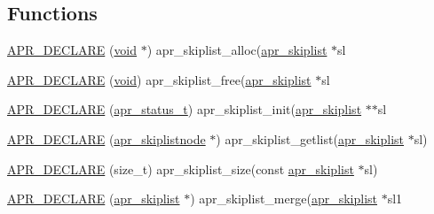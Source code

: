 \subsection*{Functions}
\begin{DoxyCompactItemize}
\item 
\hyperlink{group__apr__skiplist_ga2da4fac756c6e1437849a78294df5b98}{A\+P\+R\+\_\+\+D\+E\+C\+L\+A\+RE} (\hyperlink{group__MOD__ISAPI_gacd6cdbf73df3d9eed42fa493d9b621a6}{void} $\ast$) apr\+\_\+skiplist\+\_\+alloc(\hyperlink{structapr__skiplist}{apr\+\_\+skiplist} $\ast$sl
\item 
\hyperlink{group__apr__skiplist_ga7a6d3458041de4bfdfd313f802a45258}{A\+P\+R\+\_\+\+D\+E\+C\+L\+A\+RE} (\hyperlink{group__MOD__ISAPI_gacd6cdbf73df3d9eed42fa493d9b621a6}{void}) apr\+\_\+skiplist\+\_\+free(\hyperlink{structapr__skiplist}{apr\+\_\+skiplist} $\ast$sl
\item 
\hyperlink{group__apr__skiplist_gae4aea467ebc8b4d193e73dc778f3a73e}{A\+P\+R\+\_\+\+D\+E\+C\+L\+A\+RE} (\hyperlink{group__apr__errno_gaa5105fa83cc322f09382292db8b47593}{apr\+\_\+status\+\_\+t}) apr\+\_\+skiplist\+\_\+init(\hyperlink{structapr__skiplist}{apr\+\_\+skiplist} $\ast$$\ast$sl
\item 
\hyperlink{group__apr__skiplist_gaa4c873c94347b47de84402648338d0b5}{A\+P\+R\+\_\+\+D\+E\+C\+L\+A\+RE} (\hyperlink{structapr__skiplistnode}{apr\+\_\+skiplistnode} $\ast$) apr\+\_\+skiplist\+\_\+getlist(\hyperlink{structapr__skiplist}{apr\+\_\+skiplist} $\ast$sl)
\item 
\hyperlink{group__apr__skiplist_ga8169b97f9872e2cbde4fe1d5bacaaf32}{A\+P\+R\+\_\+\+D\+E\+C\+L\+A\+RE} (size\+\_\+t) apr\+\_\+skiplist\+\_\+size(const \hyperlink{structapr__skiplist}{apr\+\_\+skiplist} $\ast$sl)
\item 
\hyperlink{group__apr__skiplist_ga69b34941b536f9ce0025eddb06a427a5}{A\+P\+R\+\_\+\+D\+E\+C\+L\+A\+RE} (\hyperlink{structapr__skiplist}{apr\+\_\+skiplist} $\ast$) apr\+\_\+skiplist\+\_\+merge(\hyperlink{structapr__skiplist}{apr\+\_\+skiplist} $\ast$sl1
\end{DoxyCompactItemize}
